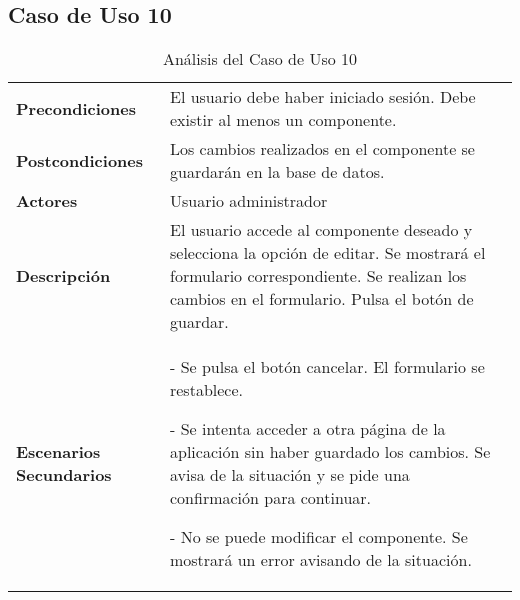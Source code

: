 \subsection{Caso de Uso 10}
\begin{table}[H]
  \centering
  \vspace{-5mm}
  \caption{Análisis del Caso de Uso 10}
    \begin{tabular}{p{7.5em}p{24.145em}}
    \toprule
    \rowcolor[rgb]{ .871,  .918,  .965} \multicolumn{2}{p{31.645em}}{\textbf{Modificar componente}} \\
    \midrule
    \rowcolor[rgb]{ .906,  .902,  .902} \textbf{Precondiciones} & \cellcolor[rgb]{ 1,  1,  1}El usuario debe haber iniciado sesión. Debe existir al menos un componente. \\
    \midrule
    \rowcolor[rgb]{ .906,  .902,  .902} \textbf{Postcondiciones} & \cellcolor[rgb]{ 1,  1,  1}Los cambios realizados en el componente se guardarán en la base de datos. \\
    \midrule
    \rowcolor[rgb]{ .906,  .902,  .902} \textbf{Actores} & \cellcolor[rgb]{ 1,  1,  1}Usuario administrador \\
    \midrule
    \rowcolor[rgb]{ .906,  .902,  .902} \textbf{Descripción} & \cellcolor[rgb]{ 1,  1,  1}El usuario accede al componente deseado y selecciona la opción de editar. Se mostrará el formulario correspondiente. Se realizan los cambios en el formulario. Pulsa el botón de guardar. \\
    \midrule
    \rowcolor[rgb]{ .906,  .902,  .902} \textbf{Escenarios          Secundarios} & \cellcolor[rgb]{ 1,  1,  1}- Se pulsa el botón cancelar. El formulario se restablece.\par - Se intenta acceder a otra página de la aplicación sin haber guardado los cambios. Se avisa de la situación y se pide una confirmación para continuar.\par - No se puede modificar el componente. Se mostrará un error avisando de la situación.  \\
    \bottomrule
    \end{tabular}%
\end{table}
 
